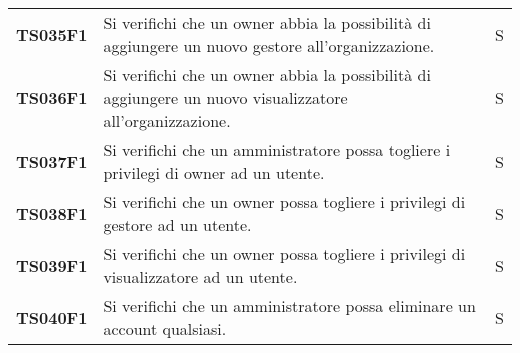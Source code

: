 \documentclass[../../piano-di-qualifica.tex]{subfiles}
\begin{document}
\begin{longtable}[H]{>{\centering\bfseries}m{3cm} >{}m{10cm} >{\centering\arraybackslash}m{3cm}}
  TS035F1            & Si verifichi che un owner abbia la possibilità di aggiungere un nuovo gestore all'organizzazione.
                     & S                                                                                                                                                                                                                                                   \\

  TS036F1            & Si verifichi che un owner abbia la possibilità di aggiungere un nuovo visualizzatore all'organizzazione.
                     & S                                                                                                                                                                                                                                                   \\

  TS037F1            & Si verifichi che un amministratore possa togliere i privilegi di owner ad un utente.
                     & S                                                                                                                                                                                                                                                  \\

  TS038F1            & Si verifichi che un owner possa togliere i privilegi di gestore ad un utente.
                     & S                                                                                                                                                                                                                                                   \\

  TS039F1            & Si verifichi che un owner possa togliere i privilegi di visualizzatore ad un utente.
                     & S                                                                                                                                                                                                                                                   \\

  TS040F1            & Si verifichi che un amministratore possa eliminare un account qualsiasi.
                     & S                                                                                                                                                                                                                                                  \\


\end{longtable}
\end{document}
